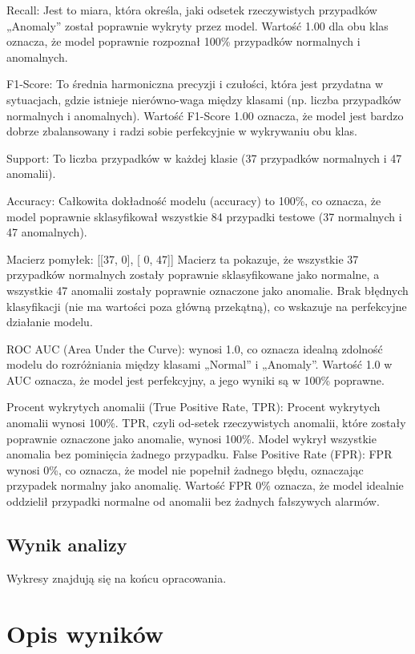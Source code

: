 \documentclass[a4paper,fleqn]{cas-dc}
\begin{document}
Recall: Jest to miara, która określa, jaki odsetek rzeczywistych przypadków „Anomaly” został poprawnie wykryty przez model. Wartość 1.00 dla obu klas oznacza, że model poprawnie rozpoznał 100\% przypadków normalnych i anomalnych.

F1-Score: To średnia harmoniczna precyzji i czułości, która jest przydatna w sytuacjach, gdzie istnieje nierówno-waga między klasami (np. liczba przypadków normalnych i anomalnych). Wartość F1-Score 1.00 oznacza, że model jest bardzo dobrze zbalansowany i radzi sobie perfekcyjnie w wykrywaniu obu klas.

Support: To liczba przypadków w każdej klasie (37 przypadków normalnych i 47 anomalii).

Accuracy: Całkowita dokładność modelu (accuracy) to 100\%, co oznacza, że model poprawnie sklasyfikował wszystkie 84 przypadki testowe (37 normalnych i 47 anomalnych).

Macierz pomyłek:
[[37, 0],
 [ 0, 47]]
Macierz ta pokazuje, że wszystkie 37 przypadków normalnych zostały poprawnie sklasyfikowane jako normalne, a wszystkie 47 anomalii zostały poprawnie oznaczone jako anomalie. Brak błędnych klasyfikacji (nie ma wartości poza główną przekątną), co wskazuje na perfekcyjne działanie modelu.

ROC AUC (Area Under the Curve):  wynosi 1.0, co oznacza idealną zdolność modelu do rozróżniania między klasami „Normal” i „Anomaly”. Wartość 1.0 w AUC oznacza, że model jest perfekcyjny, a jego wyniki są w 100\% poprawne.

Procent wykrytych anomalii (True Positive Rate, TPR): Procent wykrytych anomalii wynosi 100\%. TPR, czyli od-setek rzeczywistych anomalii, które zostały poprawnie oznaczone jako anomalie, wynosi 100\%. Model wykrył wszystkie anomalia bez pominięcia żadnego przypadku.
False Positive Rate (FPR): FPR wynosi 0\%, co oznacza, że model nie popełnił żadnego błędu, oznaczając przypadek normalny jako anomalię. Wartość FPR 0\% oznacza, że model idealnie oddzielił przypadki normalne od anomalii bez żadnych fałszywych alarmów.


\subsection{Wynik analizy}

 Wykresy znajdują się na końcu opracowania.


\section{Opis wyników}
\end{document}
